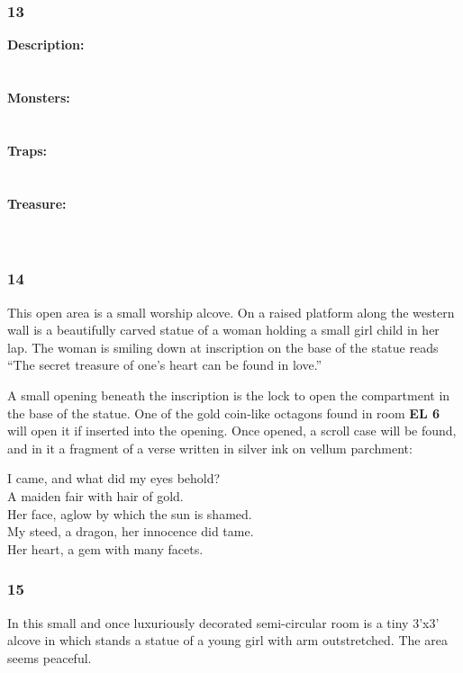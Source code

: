 \documentclass[palace_of_the_silver_princess]{subfiles}
\begin{document}
\subsubsection{13}
\textbf{Description:}
\\
\\
\\
\textbf{Monsters:}
\\
\\
\\
\textbf{Traps:}
\\
\\
\\
\textbf{Treasure:}
\\
\\
\\

\subsubsection{14}
\begin{quotebox}
    This open area is a small worship alcove. On a raised platform
    along the western wall is a beautifully carved statue of a woman
    holding a small girl child in her lap. The woman is smiling down at
    inscription on the base of the statue reads “The secret treasure of
    one’s heart can be found in love.”
\end{quotebox}

A small opening beneath the inscription is the lock to open the
compartment in the base of the statue. One of the gold coin-like
octagons found in room \textbf{EL 6} will open it if inserted into the
opening.  Once opened, a scroll case will be found, and in it a fragment
of a verse written in silver ink on vellum parchment:

\begin{commentbox}{}
    I came, and what did my eyes behold? \\
    A maiden fair with hair of gold. \\
    Her face, aglow by which the sun is shamed. \\
    My steed, a dragon, her innocence did tame. \\
    Her heart, a gem with many facets.
\end{commentbox}

\subsubsection{15}
\begin{quotebox}
    In this small and once luxuriously decorated semi-circular room is a
    tiny 3’x3’ alcove in which stands a statue of a young girl with arm
    outstretched. The area seems peaceful.
\end{quotebox}
\end{document}
